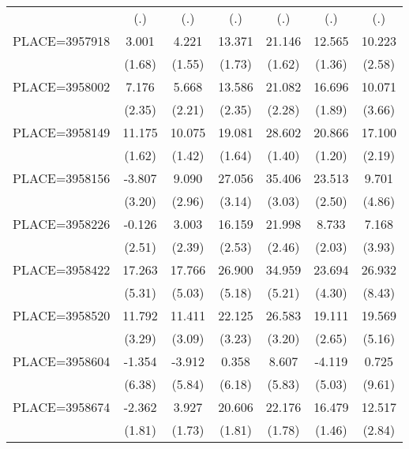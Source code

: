 {\begin{tabular}{l*{6}{c}}
                    &         (.)&         (.)&         (.)&         (.)&         (.)&         (.)\\
PLACE=3957918       &       3.001&       4.221&      13.371&      21.146&      12.565&      10.223\\
                    &      (1.68)&      (1.55)&      (1.73)&      (1.62)&      (1.36)&      (2.58)\\
PLACE=3958002       &       7.176&       5.668&      13.586&      21.082&      16.696&      10.071\\
                    &      (2.35)&      (2.21)&      (2.35)&      (2.28)&      (1.89)&      (3.66)\\
PLACE=3958149       &      11.175&      10.075&      19.081&      28.602&      20.866&      17.100\\
                    &      (1.62)&      (1.42)&      (1.64)&      (1.40)&      (1.20)&      (2.19)\\
PLACE=3958156       &      -3.807&       9.090&      27.056&      35.406&      23.513&       9.701\\
                    &      (3.20)&      (2.96)&      (3.14)&      (3.03)&      (2.50)&      (4.86)\\
PLACE=3958226       &      -0.126&       3.003&      16.159&      21.998&       8.733&       7.168\\
                    &      (2.51)&      (2.39)&      (2.53)&      (2.46)&      (2.03)&      (3.93)\\
PLACE=3958422       &      17.263&      17.766&      26.900&      34.959&      23.694&      26.932\\
                    &      (5.31)&      (5.03)&      (5.18)&      (5.21)&      (4.30)&      (8.43)\\
PLACE=3958520       &      11.792&      11.411&      22.125&      26.583&      19.111&      19.569\\
                    &      (3.29)&      (3.09)&      (3.23)&      (3.20)&      (2.65)&      (5.16)\\
PLACE=3958604       &      -1.354&      -3.912&       0.358&       8.607&      -4.119&       0.725\\
                    &      (6.38)&      (5.84)&      (6.18)&      (5.83)&      (5.03)&      (9.61)\\
PLACE=3958674       &      -2.362&       3.927&      20.606&      22.176&      16.479&      12.517\\
                    &      (1.81)&      (1.73)&      (1.81)&      (1.78)&      (1.46)&      (2.84)\\

\end{tabular}}
